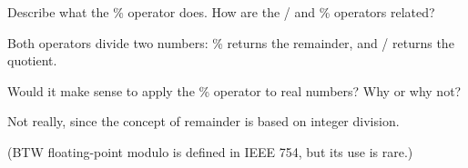 \Q \label{modoper}
Describe what the \% operator does.
How are the / and \% operators related?

\begin{answer}
Both operators divide two numbers: \% returns the remainder, and / returns the quotient.
\end{answer}


\Q \label{modreal}
Would it make sense to apply the \% operator to real numbers?
Why or why not?

\begin{answer}
Not really, since the concept of remainder is based on integer division.

(BTW floating-point modulo is defined in IEEE 754, but its use is rare.)
\end{answer}
